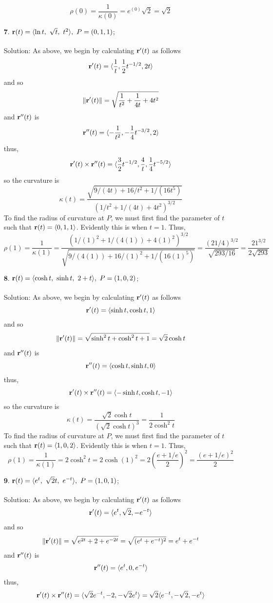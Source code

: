 \documentclass[12pt]{amsbook}
\newcommand{\la}{\langle}
\newcommand{\ra}{\rangle}
\begin{document}
\begin{enumerate}
  $$\rho(0)=\frac{1}{\kappa(0)}=e^(0)\sqrt{2}=\sqrt{2}$$
  \item[{\small\bf 7}.] ${\bf r}(t)=\la \ln t,\ \sqrt{t},\ t^2\ra, \ P=(0,1,1)$;
  \\
  \\
  {\sc Solution}: As above, we begin by calculating ${\bf r}'(t)$ as follows
  $${\bf r}'(t)=\la \frac{1}{t},\frac{1}{2} t^{-1/2}, 2t\ra$$
  and so 
  $$\|{\bf r}'(t)\|=\sqrt{\frac{1}{t^2}+\frac{1}{4t}+4t^2}$$
  and ${\bf r}''(t)$ is
  $${\bf r}''(t)=\la -\frac{1}{t^2}, -\frac{1}{4}t^{-3/2}, 2\ra$$
  thus,
  $${\bf r}'(t)\times{\bf r}''(t)=\la \frac{3}{2}t^{-1/2}, \frac{4}{t} , \frac{1}{4}t^{-5/2} \ra$$
  so the curvature is
  $$\kappa(t)=\frac{\sqrt{9/(4t)+16/t^2+1/(16t^5)}}{(1/t^2+1/(4t)+4t^2)^{3/2}}$$
  To find the radius of curvature at $P$, we must first find the parameter of $t$ such that ${\bf r}(t)=\la 0,1,1 \ra$. Evidently this is when $t=1$. Thus,
  $$\rho(1)=\frac{1}{\kappa(1)}=\frac{(1/(1)^2+1/(4(1))+4(1)^2)^{3/2}}{\sqrt{9/(4(1))+16/(1)^2+1/(16(1)^5)}}=\frac{(21/4)^{3/2}}{\sqrt{293/16}}=\frac{21^{3/2}}{2\sqrt{293}}$$
  \item[{\small\bf 8}.] ${\bf r}(t)=\la \cosh t,\ \sinh t,\ 2+t\ra, \ P=(1,0,2)$;
  \\
  \\
  {\sc Solution}: As above, we begin by calculating ${\bf r}'(t)$ as follows
  $${\bf r}'(t)=\la \sinh t,\cosh t, 1\ra$$
  and so 
  $$\|{\bf r}'(t)\|=\sqrt{\sinh^2t+\cosh^2t+1}=\sqrt{2}\cosh t$$
  and ${\bf r}''(t)$ is
  $${\bf r}''(t)=\la \cosh t, \sinh t, 0\ra$$
  thus,
  $${\bf r}'(t)\times{\bf r}''(t)=\la -\sinh t, \cosh t, -1 \ra$$
  so the curvature is
  $$\kappa(t)=\frac{\sqrt{2}\cosh t}{(\sqrt{2}\cosh t)^3}=\frac{1}{2\cosh^2 t}$$
  To find the radius of curvature at $P$, we must first find the parameter of $t$ such that ${\bf r}(t)=\la 1,0,2 \ra$. Evidently this is when $t=1$. Thus,
  $$\rho(1)=\frac{1}{\kappa(1)}=2\cosh^2 t=2\cosh(1)^2=2(\frac{e+1/e}{2})^2=\frac{(e+1/e)^2}{2}$$
  \item[{\small\bf 9}.] ${\bf r}(t)=\la e^t,\ \sqrt{2}t,\ e^{-t}\ra, \ P=(1,0,1)$;
  \\
  \\
  {\sc Solution}: As above, we begin by calculating ${\bf r}'(t)$ as follows
  $${\bf r}'(t)=\la e^t, \sqrt{2}, -e^{-t}\ra$$
  and so 
  $$\|{\bf r}'(t)\|=\sqrt{e^{2t}+2+e^{-2t}}=\sqrt{(e^t+e^{-t})^2}=e^t+e^{-t}$$
  and ${\bf r}''(t)$ is
  $${\bf r}''(t)=\la e^{t},0,e^{-t}\ra$$
  thus,
  $${\bf r}'(t)\times{\bf r}''(t)=\la \sqrt{2}e^{-t}, -2, -\sqrt{2}e^t \ra=\sqrt{2}\la e^{-t}, -\sqrt{2}, -e^t \ra$$

\end{enumerate}
\end{document}
